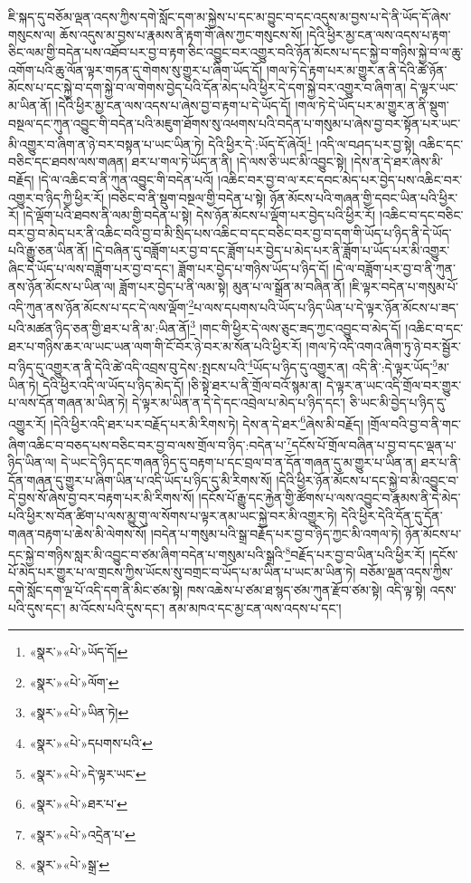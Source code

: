 ཇི་སྐད་དུ་བཅོམ་ལྡན་འདས་ཀྱིས་དགེ་སློང་དག་མ་སྐྱེས་པ་དང་མ་བྱུང་བ་དང་འདུས་མ་བྱས་པ་དེ་ནི་ཡོད་དོ་ཞེས་གསུངས་ལ། ཆོས་འདུས་མ་བྱས་པ་རྣམས་ནི་རྟག་གོ་ཞེས་ཀྱང་གསུངས་སོ། །དེའི་ཕྱིར་མྱ་ངན་ལས་འདས་པ་རྟག་ཅིང་ལམ་གྱི་བདེན་པས་འཐོབ་པར་བྱ་བ་རྟག་ཅིང་འབྱུང་བར་འགྱུར་བའི་ཉོན་མོངས་པ་དང་སྐྱེ་བ་གཉིས་སྐྱེ་བ་ལ་ཆུ་འགོག་པའི་ཆུ་ལོན་ལྟར་གཏན་དུ་གེགས་སུ་གྱུར་པ་ཞིག་ཡོད་དོ། །གལ་ཏེ་དེ་རྟག་པར་མ་གྱུར་ན་ནི་དེའི་ཚེ་ཉོན་མོངས་པ་དང་སྐྱེ་བ་དག་སྐྱེ་བ་ལ་གེགས་བྱེད་པའི་དོན་མེད་པའི་ཕྱིར་དེ་དག་སྐྱེ་བར་འགྱུར་བ་ཞིག་ན། དེ་ལྟར་ཡང་མ་ཡིན་ནོ། །དེའི་ཕྱིར་མྱ་ངན་ལས་འདས་པ་ཞེས་བྱ་བ་རྟག་པ་དེ་ཡོད་དོ། །གལ་ཏེ་དེ་ཡོད་པར་མ་གྱུར་ན་ནི་སྡུག་བསྔལ་དང་ཀུན་འབྱུང་གི་བདེན་པའི་མཇུག་ཐོགས་སུ་འཕགས་པའི་བདེན་པ་གསུམ་པ་ཞེས་བྱ་བར་སྟོན་པར་ཡང་མི་འགྱུར་བ་ཞིག་ན་ཉེ་བར་བསྟན་པ་ཡང་ཡིན་ཏེ། དེའི་ཕྱིར་དེ་:ཡོད་དོ་ཞེའོ།\footnote{«སྣར་»«པེ་»ཡོད་དོ།} །འདི་ལ་བཤད་པར་བྱ་སྟེ། འཆིང་དང་བཅིང་དང་ཐབས་ལས་གཞན། ཐར་པ་གལ་ཏེ་ཡོད་ན་ནི། །དེ་ལས་ཅི་ཡང་མི་འབྱུང་སྟེ། །དེས་ན་དེ་ཐར་ཞེས་མི་བརྗོད། །དེ་ལ་འཆིང་བ་ནི་ཀུན་འབྱུང་གི་བདེན་པའོ། །འཆིང་བར་བྱ་བ་ལ་རང་དབང་མེད་པར་བྱེད་པས་འཆིང་བར་འགྱུར་བ་ཉིད་ཀྱི་ཕྱིར་རོ། །བཅིང་བ་ནི་སྡུག་བསྔལ་གྱི་བདེན་པ་སྟེ། ཉོན་མོངས་པའི་གཞན་གྱི་དབང་ཡིན་པའི་ཕྱིར་རོ། །དེ་ལྡོག་པའི་ཐབས་ནི་ལམ་གྱི་བདེན་པ་སྟེ། དེས་ཉོན་མོངས་པ་ལྡོག་པར་བྱེད་པའི་ཕྱིར་རོ། །འཆིང་བ་དང་བཅིང་བར་བྱ་བ་མེད་པར་ནི་འཆིང་བའི་བྱ་བ་མི་སྲིད་པས་འཆིང་བ་དང་བཅིང་བར་བྱ་བ་དག་གི་ཡོད་པ་ཉིད་ནི་དེ་ཡོད་པའི་རྒྱུ་ཅན་ཡིན་ནོ། །དེ་བཞིན་དུ་བཟློག་པར་བྱ་བ་དང་ཟློག་པར་བྱེད་པ་མེད་པར་ནི་ཟློག་པ་ཡོད་པར་མི་འགྱུར་ཞིང་དེ་ཡོད་པ་ལས་བཟློག་པར་བྱ་བ་དང་། ཟློག་པར་བྱེད་པ་གཉིས་ཡོད་པ་ཉིད་དོ། །དེ་ལ་བཟློག་པར་བྱ་བ་ནི་ཀུན་ནས་ཉོན་མོངས་པ་ཡིན་ལ། ཟློག་པར་བྱེད་པ་ནི་ལམ་སྟེ། མུན་པ་ལ་སྒྲོན་མ་བཞིན་ནོ། །ཇི་ལྟར་བདེན་པ་གསུམ་པོ་འདི་ཀུན་ནས་ཉོན་མོངས་པ་དང་དེ་ལས་ལྡོག་\footnote{«སྣར་»«པེ་»ལོག་}པ་ལས་དཔགས་པའི་ཡོད་པ་ཉིད་ཡིན་པ་དེ་ལྟར་ཉོན་མོངས་པ་ཟད་པའི་མཚན་ཉིད་ཅན་གྱི་ཐར་པ་ནི་མ་:ཡིན་ནོ།\footnote{«སྣར་»«པེ་»ཡིན་ཏེ།} །གང་གི་ཕྱིར་དེ་ལས་ཅུང་ཟད་ཀྱང་འབྱུང་བ་མེད་དོ། །འཆིང་བ་དང་ཐར་པ་གཉིས་ཆར་ལ་ཡང་ཡན་ལག་གི་ངོ་བོར་ཉེ་བར་མ་སོན་པའི་ཕྱིར་རོ། །གལ་ཏེ་འདི་འགའ་ཞིག་ཏུ་ཉེ་བར་སྦྱོར་བ་ཉིད་དུ་འགྱུར་ན་ནི་དེའི་ཚེ་འདི་འབྲས་བུ་དེས་:སྤངས་པའི་\footnote{«སྣར་»«པེ་»དཔགས་པའི་}ཡོད་པ་ཉིད་དུ་འགྱུར་ན། འདི་ནི་:དེ་ལྟར་ཡོད་\footnote{«སྣར་»«པེ་»དེ་ལྟར་ཡང་}མ་ཡིན་ཏེ། དེའི་ཕྱིར་འདི་ལ་ཡོད་པ་ཉིད་མེད་དོ། །ཅི་སྟེ་ཐར་པ་ནི་གྲོལ་བའོ་སྙམ་ན། དེ་ལྟར་ན་ཡང་འདི་གྲོལ་བར་གྱུར་པ་ལས་དོན་གཞན་མ་ཡིན་ཏེ། དེ་ལྟར་མ་ཡིན་ན་དེ་དེ་དང་འབྲེལ་པ་མེད་པ་ཉིད་དང་། ཅི་ཡང་མི་བྱེད་པ་ཉིད་དུ་འགྱུར་རོ། །དེའི་ཕྱིར་འདི་ཐར་པར་བརྗོད་པར་མི་རིགས་ཏེ། དེས་ན་དེ་ཐར་\footnote{«སྣར་»«པེ་»ཐར་པ་}ཞེས་མི་བརྗོད། །གྲོལ་བའི་བྱ་བ་ནི་གང་ཞིག་འཆིང་བ་བཅད་པས་བཅིང་བར་བྱ་བ་ལས་གྲོལ་བ་ཉིད་:བདེན་པ་\footnote{«སྣར་»«པེ་»འདྲེན་པ་}དངོས་པོ་གྲོལ་བཞིན་པ་བྱ་བ་དང་ལྡན་པ་ཉིད་ཡིན་ལ། དེ་ཡང་དེ་ཉིད་དང་གཞན་ཉིད་དུ་བརྟག་པ་དང་བྲལ་བ་ན་དོན་གཞན་དུ་མ་གྱུར་པ་ཡིན་ན། ཐར་པ་ནི་དོན་གཞན་དུ་གྱུར་པ་ཞིག་ཡིན་པ་འདི་ཡོད་པ་ཉིད་དུ་མི་རིགས་སོ། །དེའི་ཕྱིར་ཉོན་མོངས་པ་དང་སྐྱེ་བ་མི་འབྱུང་བ་དེ་བྱས་སོ་ཞེས་བྱ་བར་བརྟག་པར་མི་རིགས་སོ། །དངོས་པོ་རྒྱུ་དང་རྐྱེན་གྱི་ཚོགས་པ་ལས་འབྱུང་བ་རྣམས་ནི་དེ་མེད་པའི་ཕྱིར་ས་བོན་ཚིག་པ་ལས་མྱུ་གུ་ལ་སོགས་པ་ལྟར་ནམ་ཡང་སྐྱེ་བར་མི་འགྱུར་ཏེ། དེའི་ཕྱིར་དེའི་དོན་དུ་དོན་གཞན་བརྟག་པ་ཆེས་མི་ལེགས་སོ། །བདེན་པ་གསུམ་པའི་སྒྲ་བརྗོད་པར་བྱ་བ་ཉིད་ཀྱང་མི་འགལ་ཏེ། ཉོན་མོངས་པ་དང་སྐྱེ་བ་གཉིས་སླར་མི་འབྱུང་བ་ཙམ་ཞིག་བདེན་པ་གསུམ་པའི་སྒྲའི་\footnote{«སྣར་»«པེ་»སྒྲ་}བརྗོད་པར་བྱ་བ་ཡིན་པའི་ཕྱིར་རོ། །དངོས་པོ་མེད་པར་གྱུར་པ་ལ་གྲངས་ཀྱིས་ཡོངས་སུ་བགྲང་བ་ཡོད་པ་མ་ཡིན་པ་ཡང་མ་ཡིན་ཏེ། བཅོམ་ལྡན་འདས་ཀྱིས་དགེ་སློང་དག་ལྔ་པོ་འདི་དག་ནི་མིང་ཙམ་སྟེ། ཁས་འཆེས་པ་ཙམ་ཐ་སྙད་ཙམ་ཀུན་རྫོབ་ཙམ་སྟེ། འདི་ལྟ་སྟེ། འདས་པའི་དུས་དང་། མ་འོངས་པའི་དུས་དང་། ནམ་མཁའ་དང་མྱ་ངན་ལས་འདས་པ་དང་། 